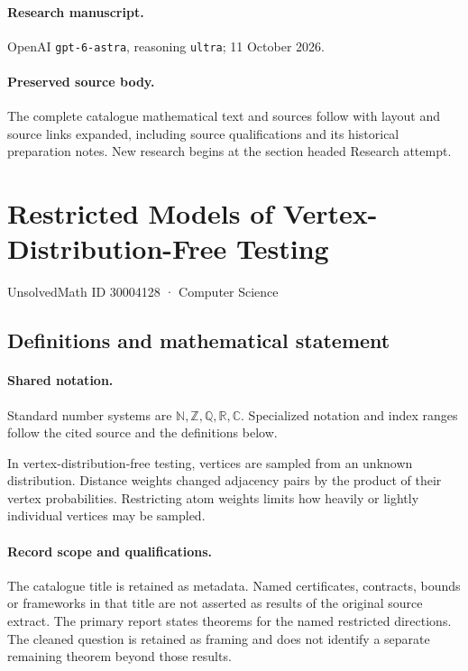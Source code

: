 \documentclass[11pt]{article}
\begin{document}
\paragraph{Research manuscript.} OpenAI \texttt{gpt-6-astra}, reasoning \texttt{ultra}; 11 October 2026.
\paragraph{Preserved source body.} The complete catalogue mathematical text and sources follow with layout and source links expanded, including source qualifications and its historical preparation notes. New research begins at the section headed Research attempt.

\section{Restricted Models of Vertex-Distribution-Free Testing}\label{30004128}
{\small UnsolvedMath ID 30004128 · Computer Science}
\subsection{Definitions and mathematical statement}

\paragraph{Shared notation.}Standard number systems are $\mathbb N,\mathbb Z,\mathbb Q,\mathbb R,\mathbb C$. Specialized notation and index ranges follow the cited source and the definitions below.


In vertex-distribution-free testing, vertices are sampled from an unknown distribution. Distance weights changed adjacency pairs by the product of their vertex probabilities. Restricting atom weights limits how heavily or lightly individual vertices may be sampled.
\paragraph{Record scope and qualifications.}
The catalogue title is retained as metadata. Named certificates, contracts, bounds or frameworks in that title are not asserted as results of the original source extract.
The primary report states theorems for the named restricted directions. The cleaned question is retained as framing and does not identify a separate remaining theorem beyond those results.
\end{document}
